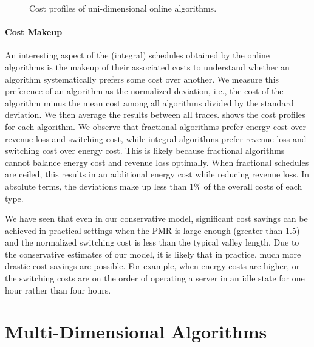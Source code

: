 \begin{figure}
    \centering
    
    \caption{Cost profiles of uni-dimensional online algorithms.}\label{fig:case_studies:ud:costs}
\end{figure}

\paragraph{Cost Makeup} An interesting aspect of the (integral) schedules obtained by the online algorithms is the makeup of their associated costs to understand whether an algorithm systematically prefers some cost over another. We measure this preference of an algorithm as the normalized deviation, i.e., the cost of the algorithm minus the mean cost among all algorithms divided by the standard deviation. We then average the results between all traces.  shows the cost profiles for each algorithm. We observe that fractional algorithms prefer energy cost over revenue loss and switching cost, while integral algorithms prefer revenue loss and switching cost over energy cost. This is likely because fractional algorithms cannot balance energy cost and revenue loss optimally. When fractional schedules are ceiled, this results in an additional energy cost while reducing revenue loss. In absolute terms, the deviations make up less than 1\% of the overall costs of each type.

We have seen that even in our conservative model, significant cost savings can be achieved in practical settings when the PMR is large enough (greater than 1.5) and the normalized switching cost is less than the typical valley length. Due to the conservative estimates of our model, it is likely that in practice, much more drastic cost savings are possible. For example, when energy costs are higher, or the switching costs are on the order of operating a server in an idle state for one hour rather than four hours.

\section{Multi-Dimensional Algorithms}

